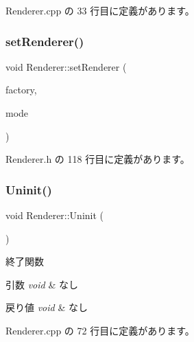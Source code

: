  Renderer.\+cpp の 33 行目に定義があります。

\mbox{\label{class_renderer_a02e3c483b2c9d8024e51639a06159066}} 
\subsubsection{\texorpdfstring{set\+Renderer()}{setRenderer()}}
{\footnotesize\ttfamily void Renderer\+::set\+Renderer (\begin{DoxyParamCaption}\item[{\mbox{\hyperlink{class_renderer_factory_interface}{Renderer\+Factory\+Interface}} $\ast$}]{factory,  }\item[{\mbox{\hyperlink{class_renderer_ab5a9379ccadcf2b3394c61cf8c835fec}{M\+O\+DE}}}]{mode }\end{DoxyParamCaption})\hspace{0.3cm}{\ttfamily [inline]}}



 Renderer.\+h の 118 行目に定義があります。

\mbox{\label{class_renderer_ae865246d6a04d467ac22458f6f5f69d4}} 
\subsubsection{\texorpdfstring{Uninit()}{Uninit()}}
{\footnotesize\ttfamily void Renderer\+::\+Uninit (\begin{DoxyParamCaption}{ }\end{DoxyParamCaption})}



終了関数 


\begin{DoxyParams}{引数}
{\em void} & なし \\
\hline
\end{DoxyParams}

\begin{DoxyRetVals}{戻り値}
{\em void} & なし \\
\hline
\end{DoxyRetVals}


 Renderer.\+cpp の 72 行目に定義があります。



